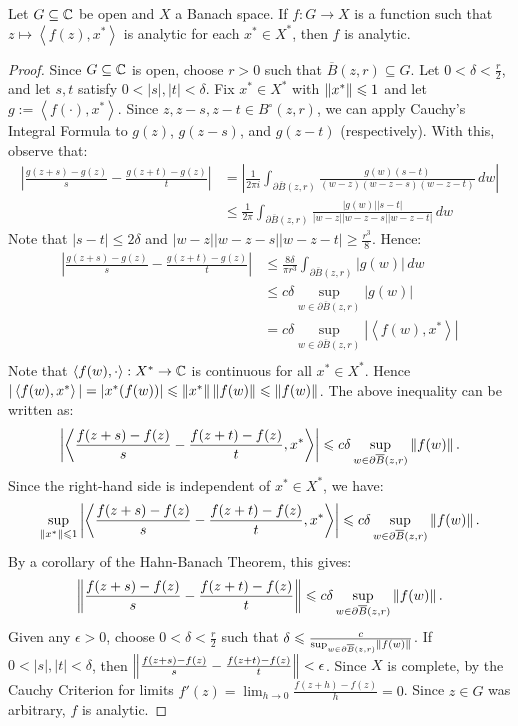 \begin{proposition}
	Let $G \subseteq \mathbb{C}$ be open and $X$ a Banach space. If $f:G \rightarrow X$ is a function such that $z \mapsto \left<f(z),x^\ast \right>$ is analytic for each $x^\ast \in X^\ast$, then $f$ is analytic.
\end{proposition}
	\begin{proof}
		Since $G \subseteq \mathbb{C}$ is open, choose $r > 0$ such that $\overline{B}(z,r) \subseteq G$. Let $0 < \delta < \frac{r}{2}$, and let $s,t$ satisfy $0 < |s|,|t| < \delta$. Fix $x^\ast \in X^\ast$ with $\left\lVert x^\ast \right\rVert \leqslant 1$ and let $g:= \left<f(\cdot),x^\ast \right>$. Since $z,z-s,z-t \in B^\circ(z,r)$, we can apply Cauchy's Integral Formula to $g(z)$, $g(z-s)$, and $g(z-t)$ (respectively). With this, observe that:
		\begin{align*}
			\left| \frac{g(z+s) - g(z)}{s} - \frac{g(z+t) - g(z)}{t} \right| 
			&= \left| \frac{1}{2\pi i} \int_{\partial \overline{B}(z,r)}^{} \frac{g(w)(s-t)}{(w-z)(w-z-s)(w-z-t)}\,dw \right|  \\
			&\leq \frac{1}{2 \pi} \int_{\partial \overline{B}(z,r)}^{} \frac{|g(w)| |s-t|}{|w-z||w-z-s||w-z-t|}\,dw 
		\end{align*}
		Note that $|s - t| \leq 2\delta$ and $|w-z||w-z-s||w-z-t| \geq \frac{r^3}{8}$. Hence:
		\begin{align*}
			\left| \frac{g(z+s) - g(z)}{s} - \frac{g(z+t) - g(z)}{t} \right| 
			&\leq \frac{8\delta}{\pi r^3} \int_{\partial \overline{B}(z,r)}^{} |g(w)|\,dw \\
			&\leq c \delta \sup_{w \in \partial \overline{B}(z,r)} |g(w)| \\
			&= c\delta \sup_{w \in \partial \overline{B}(z,r)}|\left<f(w),x^\ast \right>| \\
		\end{align*}
		Note that $\left<f(w),\cdot \right>:X^\ast \rightarrow \mathbb{C}$ is continuous for all $x^\ast \in X^\ast$. Hence $|\left<f(w),x^\ast \right>| = |x^\ast(f(w))| \leqslant \left\lVert x^\ast \right\rVert \left\lVert f(w) \right\rVert \leqslant \left\lVert f(w) \right\rVert$. The above inequality can be written as:
		\[
			\left| \left<\frac{f(z+s) - f(z)}{s} - \frac{f(z+t) - f(z)}{t}, x^\ast \right> \right| \leqslant c\delta \sup_{w \in \partial \overline{B}(z,r)}\left\lVert f(w) \right\rVert.
		\] 
		Since the right-hand side is independent of $x^\ast \in X^\ast$, we have:
		\[
			\sup_{\left\lVert x^\ast \right\rVert \leqslant 1}\left| \left<\frac{f(z+s) - f(z)}{s} - \frac{f(z+t) - f(z)}{t}, x^\ast \right> \right| \leqslant c\delta \sup_{w \in \partial \overline{B}(z,r)}\left\lVert f(w) \right\rVert.
		\] 
		By a corollary of the Hahn-Banach Theorem, this gives:
		\[
			\left\lVert \frac{f(z+s) - f(z)}{s} - \frac{f(z+t) - f(z)}{t} \right\rVert \leqslant c\delta \sup_{w \in \partial \overline{B}(z,r)}\left\lVert f(w) \right\rVert.
		\]
		Given any $\epsilon>0$, choose $0 < \delta < \frac{r}{2}$ such that $\delta \leqslant \frac{c}{\sup_{w \in \partial \overline{B}(z,r)}\left\lVert f(w) \right\rVert}$. If $0 < |s|,|t| < \delta$, then $\left\lVert \frac{f(z+s) - f(z)}{s} - \frac{f(z+t) - f(z)}{t} \right\rVert < \epsilon$. Since $X$ is complete, by the Cauchy Criterion for limits $f'(z) = \lim_{h \rightarrow 0}\frac{f(z+h) - f(z)}{h} = 0$. Since $z \in G$ was arbitrary, $f$ is analytic.
	\end{proof}

